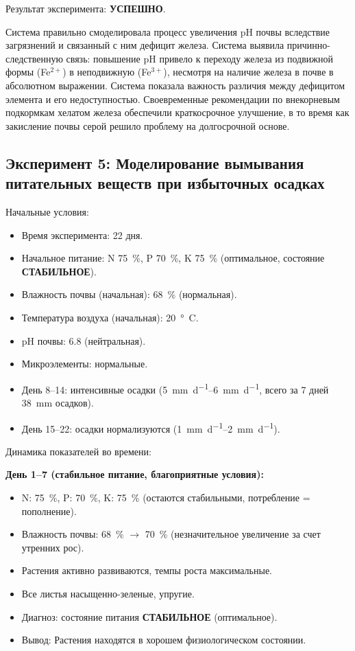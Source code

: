 Результат эксперимента: \textbf{УСПЕШНО}.

Система правильно смоделировала процесс увеличения pH почвы вследствие загрязнений и связанный с ним дефицит железа. Система выявила причинно-следственную связь: повышение pH привело к переходу железа из подвижной формы (Fe$^{2+}$) в неподвижную (Fe$^{3+}$), несмотря на наличие железа в почве в абсолютном выражении. Система показала важность различия между дефицитом элемента и его недоступностью. Своевременные рекомендации по внекорневым подкормкам хелатом железа обеспечили краткосрочное улучшение, в то время как закисление почвы серой решило проблему на долгосрочной основе.


\subsection{Эксперимент 5: Моделирование вымывания питательных веществ при избыточных осадках}

Начальные условия:
\begin{itemize}
    \item Время эксперимента: \num{22} дня.
    \item Начальное питание: N \SI{75}{\percent}, P \SI{70}{\percent}, K \SI{75}{\percent} (оптимальное, состояние \textbf{СТАБИЛЬНОЕ}).
    \item Влажность почвы (начальная): \SI{68}{\percent} (нормальная).
    \item Температура воздуха (начальная): \SI{20}{\degree C}.
    \item pH почвы: \num{6.8} (нейтральная).
    \item Микроэлементы: нормальные.
    \item День 8--14: интенсивные осадки (\SIrange{5}{6}{\milli\meter\per\day}, всего за \num{7} дней \SI{38}{\milli\meter} осадков).
    \item День 15--22: осадки нормализуются (\SIrange{1}{2}{\milli\meter\per\day}).
\end{itemize}

Динамика показателей во времени:

\textbf{День 1--7 (стабильное питание, благоприятные условия):}
\begin{itemize}
    \item N: \SI{75}{\percent}, P: \SI{70}{\percent}, K: \SI{75}{\percent} (остаются стабильными, потребление = пополнение).
    \item Влажность почвы: \SI{68}{\percent} $\to$ \SI{70}{\percent} (незначительное увеличение за счет утренних рос).
    \item Растения активно развиваются, темпы роста максимальные.
    \item Все листья насыщенно-зеленые, упругие.
    \item Диагноз: состояние питания \textbf{СТАБИЛЬНОЕ} (оптимальное).
    \item Вывод: Растения находятся в хорошем физиологическом состоянии.
\end{itemize}

